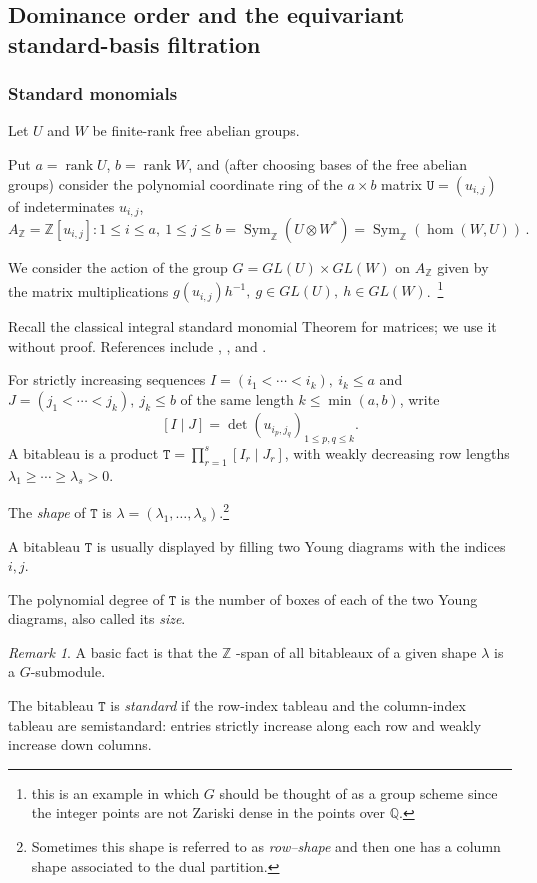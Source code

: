 \documentclass[10pt]{amsart}
\theoremstyle{definition}
\theoremstyle{remark}
\newtheorem{remark}[theorem]{Remark}
\newcommand{\Z}{\mathbb Z}
\newcommand{\Q}{\mathbb Q}
\begin{document}
\label{sec:integral-smt-divided-power}\subsection{Dominance order and the equivariant standard-basis filtration}

\subsubsection{Standard monomials\label{stmon}}\quad Let $U $ and  $W$ be   finite-rank free abelian groups. 

Put $a=\operatorname{rank} U$, $b=\operatorname{rank} W$,   and  (after choosing bases of the free abelian groups)    consider the
polynomial coordinate ring of the $a\times b$ matrix $\mathtt U=(u_{i,j})$ of indeterminates $u_{i,j}$,
\begin{equation}\label{azz}
A_{\mathbb Z}=\mathbb Z[u_{i,j}]:1\leq i\leq a,\ 1\leq j\leq b 
 =\operatorname{Sym}_{\mathbb Z}(U \otimes W ^{*})=\operatorname{Sym}_{\mathbb Z}(\hom(W,U))\,.
\end{equation}

 
 We consider the action of the group $G=GL(U)\times GL(W)$  on $A_{\mathbb Z}$ given by the matrix multiplications $g(u_{i,j})h^{-1},\  g\in GL(U),\ h\in  GL(W)$.\ \footnote{this is an example in which $G$ should be thought of as a group scheme since the integer points  are not Zariski dense in the points over $\Q$.}\medskip
 
 Recall the
classical integral standard monomial Theorem for matrices; we use it
without proof.  References include 
\cite{Clausen}, \cite{GrosshansRotaStein},
and \cite{depr0}.

For strictly increasing sequences
$I=(i_1<\cdots<i_k),\ i_k\leq a$ and $J=(j_1<\cdots<j_k),\ j_k\leq b$ of the same length $k\leq \min(a,b)$,
write
\[
 [I\mid J]=\det(u_{i_p,j_q})_{1\leq p,q\leq k}.
\]
A bitableau is a product $\mathtt T=\prod_{r=1}^{s}[I_r\mid J_r]$,
with weakly decreasing row lengths
$\lambda_1\geq\cdots\geq\lambda_s>0$. \smallskip

The {\em shape} of $\mathtt T$ is $\lambda=(\lambda_1,\ldots,\lambda_s)$.\footnote{Sometimes this shape is referred to as {\em row--shape}  and then one has a column shape associated to the dual partition.}  

A bitableau $\mathtt T$ is usually displayed by filling two Young diagrams with the indices $i,j$.  

The polynomial degree of $\mathtt T$    is the number of boxes of each of the two Young diagrams, also called its {\em size}.
\begin{remark}\label{spb}
A basic fact is that the $\Z$ -span of all bitableaux of a given shape  $\lambda$  is a $G$-submodule.
\end{remark}
The bitableau $\mathtt T$  is \emph{standard} if the
row-index tableau and the column-index tableau are semistandard:
entries strictly increase along each row and weakly increase down
columns. 
\end{document}
